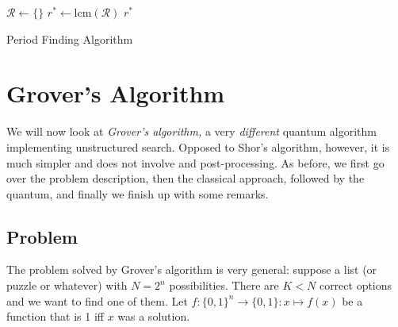 			\begin{algorithm}  \DontPrintSemicolon
				\( \mathcal{R} \gets \{ \} \)  \quad{}
				\( r^\ast \gets \mathrm{lcm}(\mathcal{R}) \)  \quad{}
				\Return \( r^\ast \) \;
				\caption{Period Finding Algorithm}
				\label{alg:period}
			\end{algorithm}

	\section{Grover's Algorithm}
		\label{sec:grovers}

		We will now look at \emph{Grover's algorithm,} a very \emph{different} quantum algorithm implementing unstructured search. Opposed to Shor's algorithm, however, it is much simpler and does not involve and post-processing. As before, we first go over the problem description, then the classical approach, followed by the quantum, and finally we finish up with some remarks.

		\subsection{Problem}
			The problem solved by Grover's algorithm is very general: suppose a list (or puzzle or whatever) with \( N = 2^n \) possibilities. There are \(K < N\) correct options and we want to find one of them. Let \( f : \{ 0, 1 \}^n \to \{ 0, 1 \} : x \mapsto f(x) \) be a function that is \num{1} iff \(x\) was a solution.

